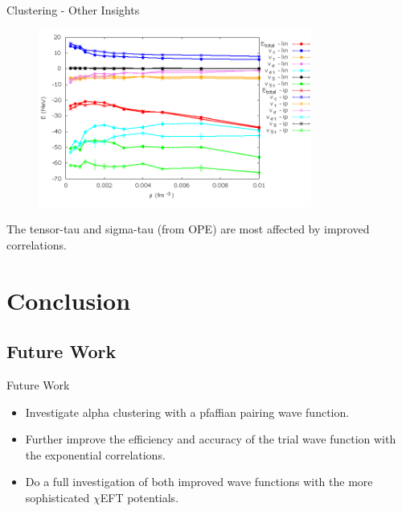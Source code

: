 \documentclass{beamer}
\begin{document}
\begin{frame}{Clustering - Other Insights}
\begin{figure}[h!]
   \centering
   \includegraphics[width=0.8\textwidth]{../figures/av6_alpha.png}
\end{figure}
The tensor-tau and sigma-tau (from OPE) are most affected by improved correlations.
\end{frame}

\section{Conclusion}
\subsection{Future Work}
\begin{frame}{Future Work}
\begin{itemize}
   \item Investigate alpha clustering with a pfaffian pairing wave function.
   \item Further improve the efficiency and accuracy of the trial wave function with the exponential correlations.
   \item Do a full investigation of both improved wave functions with the more sophisticated $\chi$EFT potentials.
\end{itemize}
\end{frame}
\end{document}
